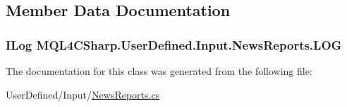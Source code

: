 \subsection{Member Data Documentation}
\subsubsection[{\texorpdfstring{L\+OG}{LOG}}]{\setlength{\rightskip}{0pt plus 5cm}I\+Log M\+Q\+L4\+C\+Sharp.\+User\+Defined.\+Input.\+News\+Reports.\+L\+OG}\hypertarget{class_m_q_l4_c_sharp_1_1_user_defined_1_1_input_1_1_news_reports_a79e68718c9b5e0cbc9248b150d3598ed}{}\label{class_m_q_l4_c_sharp_1_1_user_defined_1_1_input_1_1_news_reports_a79e68718c9b5e0cbc9248b150d3598ed}


The documentation for this class was generated from the following file\+:\begin{DoxyCompactItemize}
\item 
User\+Defined/\+Input/\hyperlink{_news_reports_8cs}{News\+Reports.\+cs}\end{DoxyCompactItemize}

